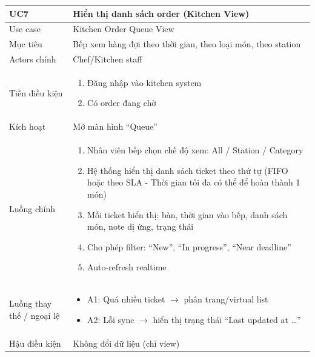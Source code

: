 \begin{longtable}{|>{\raggedright\arraybackslash}p{}|>{\raggedright\arraybackslash}p{}|}
\hline
\textbf{UC7} & \textbf{Hiển thị danh sách order (Kitchen View)} \\
\hline
Use case & Kitchen Order Queue View \\
\hline
Mục tiêu & Bếp xem hàng đợi theo thời gian, theo loại món, theo station \\
\hline
Actors chính & Chef/Kitchen staff \\
\hline
Tiền điều kiện &
\vspace{-0.5em}
\begin{enumerate}[leftmargin=*]
\item Đăng nhập vào kitchen system
\item Có order đang chờ
\end{enumerate}
\vspace{-0.5em}
\\
\hline
Kích hoạt & Mở màn hình “Queue” \\
\hline
Luồng chính &
\vspace{-0.5em}
\begin{enumerate}[leftmargin=*]
\item Nhân viên bếp chọn chế độ xem: All / Station / Category
\item Hệ thống hiển thị danh sách ticket theo thứ tự (FIFO hoặc theo SLA - Thời gian tối đa có thể để hoàn thành 1 món)
\item Mỗi ticket hiển thị: bàn, thời gian vào bếp, danh sách món, note dị ứng, trạng thái
\item Cho phép filter: “New”, “In progress”, “Near deadline”
\item Auto-refresh realtime
\end{enumerate}
\vspace{-0.5em}
\\
\hline
Luồng thay thế / ngoại lệ &
\vspace{-0.5em}
\begin{itemize}[leftmargin=*]
\item A1: Quá nhiều ticket $\rightarrow$ phân trang/virtual list
\item A2: Lỗi sync $\rightarrow$ hiển thị trạng thái “Last updated at …”
\end{itemize}
\vspace{-0.5em}
\\
\hline
Hậu điều kiện & Không đổi dữ liệu (chỉ view) \\
\hline
\end{longtable}

